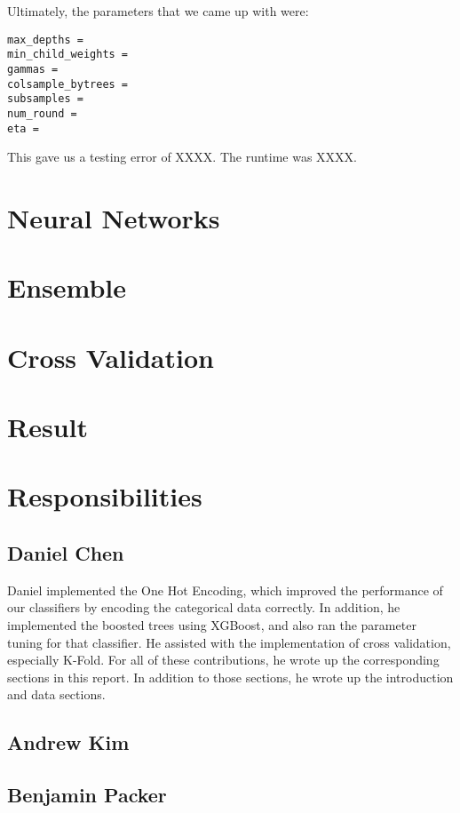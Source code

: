 \documentclass[twoside,11pt]{article}
\theoremstyle{definition}
\begin{document}
      Ultimately, the parameters that we came up with were:
      \begin{lstlisting}
max_depths =
min_child_weights =
gammas =
colsample_bytrees =
subsamples =
num_round =
eta =
      \end{lstlisting}

      This gave us a testing error of XXXX. The runtime was XXXX.

\section{Neural Networks}

\section{Ensemble}

\section{Cross Validation}

\section{Result}

\section{Responsibilities}

  \subsection{Daniel Chen}
    Daniel implemented the One Hot Encoding, which improved the performance of our classifiers by encoding the categorical data correctly. In addition, he implemented the boosted trees using XGBoost, and also ran the parameter tuning for that classifier. He assisted with the implementation of cross validation, especially K-Fold. For all of these contributions, he wrote up the corresponding sections in this report. In addition to those sections, he wrote up the introduction and data sections.

  \subsection{Andrew Kim}

  \subsection{Benjamin Packer}
\end{document}
